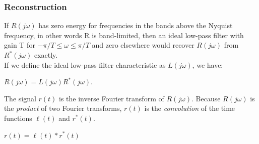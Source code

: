 \begin{frame}
	\frametitle{Reconstruction}
	If $R(j\omega)$ has zero energy for frequencies in the bands above the Nyquist frequency, in other words R is band-limited, then an ideal low-pass filter with gain T for $-\pi/T \leq \omega \leq \pi/T$ and zero elsewhere would recover $R(j\omega)$ from $R^*(j\omega)$ exactly.\\
	\medskip
	If we define the ideal low-pass filter characteristic as $L(j\omega)$, we have:
	\begin{center}
		$R(j\omega)=L(j\omega)R^*(j\omega)$.
	\end{center}
	The signal $r(t)$ is the inverse Fourier transform of $R(j\omega)$. Because $R(j\omega)$ is the \textit{product} of two Fourier transforms, $r(t)$ is the \textit{convolution} of the time functions $\ell(t)$ and $r^*(t)$.\\
	\begin{center}
		$r(t) = \ell(t) * r^*(t)$
	\end{center}
\end{frame}

